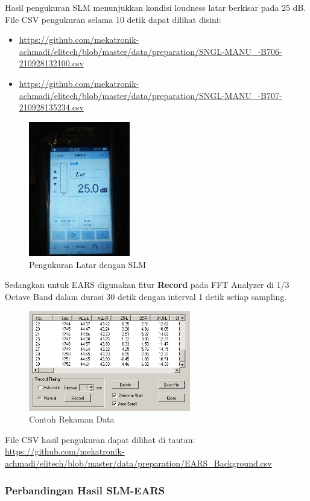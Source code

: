 \documentclass[12pt,]{article}
\begin{document}
	Hasil pengukuran SLM menunjukkan kondisi loudness latar berkisar pada 25 dB.
	File CSV pengukuran selama 10 detik dapat dilihat disini:
	\begin{itemize}
		\item \url{https://github.com/mekatronik-achmadi/elitech/blob/master/data/preparation/SNGL-MANU_-B706-210928132100.csv}
		\item \url{https://github.com/mekatronik-achmadi/elitech/blob/master/data/preparation/SNGL-MANU_-B707-210928135234.csv}
	\end{itemize}

	\newpage
	\begin{figure}[!ht]
		\centering
		\includegraphics[width=125pt]{images/slm_latar}
		\caption{Pengukuran Latar dengan SLM}
	\end{figure}

	Sedangkan untuk EARS digunakan fitur \textbf{Record} pada FFT Analyzer di 1/3 Octave Band
	dalam durasi 30 detik dengan interval 1 detik setiap sampling.

	\begin{figure}[!ht]
		\centering
		\includegraphics[width=200pt]{images/datarec}
		\caption{Contoh Rekaman Data}
	\end{figure}

	File CSV hasil pengukuran dapat dilihat di tautan:
	\url{https://github.com/mekatronik-achmadi/elitech/blob/master/data/preparation/EARS_Background.csv}

	\subsubsection{Perbandingan Hasil SLM-EARS}
\end{document}
